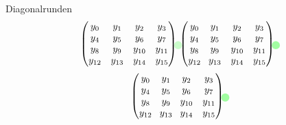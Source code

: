 \documentclass{beamer}
\newcommand{\tikzmark}[2]{
    \tikz[overlay,remember picture,baseline]
    \node[anchor=base] (#1){$#2$};
}
\begin{document}
\begin{frame}{Diagonalrunden}
\begin{equation*}
\begin{pmatrix}
\tikzmark{0}{y_0} & y_1 & y_2 & y_3 \\
y_4 &y_5 & y_6 & y_7 \\
y_8 & y_9 & y_{10} & y_{11} \\
y_{12} & y_{13} & y_{14} & \tikzmark{15}{y_{15}} \\
\end{pmatrix}
\begin{tikzpicture}[overlay,remember picture]
     \draw[opacity=.2,line width=3mm,line cap=round,color=green] (0.center) -- (15.center);
\end{tikzpicture}
\begin{pmatrix}
\hspace{0.2em}y_0 & \tikzmark{1}{y_1} & y_2 & y_3 \\
\hspace{0.2em}y_4 &y_5 & y_6 & y_7 \\
\hspace{0.2em}y_8 & y_9 & y_{10} & \tikzmark{11}{y_{11}} \\
\hspace{0.2em}\tikzmark{12}{y_{12}} & y_{13} & y_{14} & y_{15} \\
\end{pmatrix}
\begin{tikzpicture}[overlay,remember picture]
     \draw[opacity=.2,line width=3mm,line cap=round,color=green] (1.center) -- (11.center);
     \draw[opacity=.2,line width=3mm,line cap=round,color=green] (12.center) -- (12.center);
\end{tikzpicture}
\end{equation*}
\begin{equation*}
\begin{pmatrix}
y_0 & y_1 & \tikzmark{2}{y_2} & y_3 \\
y_4 &y_5 & y_6 & \tikzmark{7}{y_7} \\
\tikzmark{8}{y_8} & y_9 & y_{10} & y_{11} \\
y_{12} & \tikzmark{13}{y_{13}} & y_{14} & y_{15} \\
\end{pmatrix}
\begin{tikzpicture}[overlay,remember picture]
     \draw[opacity=.2,line width=3mm,line cap=round,color=green] (2.center) -- (7.center);
     \draw[opacity=.2,line width=3mm,line cap=round,color=green] (8.center) -- (13.center);
\end{tikzpicture}

\end{equation*}
\end{frame}
\end{document}
